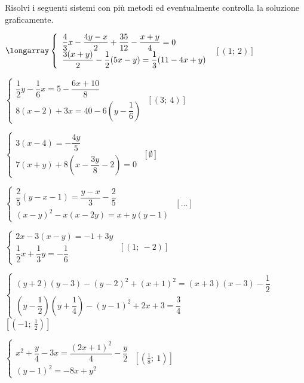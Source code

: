 \begin{esercizio}[\Ast]
 \label{ese:22.75}
 Risolvi i seguenti sistemi con più metodi ed eventualmente controlla
la soluzione graficamente.
\begin{enumeratea}
 {\longarray
 \item $\longarray\left\{\begin{array}{l}
 \dfrac{4}{3}x-\dfrac{4y-x}{2}+\dfrac{35}{12}-\dfrac{x+y}{4}=0\\
 \dfrac{3(x+y)}{2}-\dfrac{1}{2}(5x-y)=\dfrac{1}{3}(11-4x+y)\end{array}\right.$
 \hfill $\left[(1;~2)\right]$
\item $\left\{\begin{array}{l}
\dfrac{1}{2}y-\dfrac{1}{6}x=5-\dfrac{6x+10}{8}\\
8(x-2)+3x=40-6\left(y-\dfrac{1}{6}\right)\end{array}\right.$
 \hfill $\left[(3;~4)\right]$
\item $\left\{\begin{array}{l}
3(x-4)=-{\dfrac{4y}{5}}\\
7(x+y)+8\left(x-\dfrac{3y}{8}
-2\right)=0\end{array}\right.$
 \hfill $\left[\emptyset\right]$
\item $\left\{\begin{array}{l}
\dfrac{2}{5}(y-x-1)=\dfrac{y-x}{3}-\dfrac{2}{5}\\
(x-y)^{2}-x(x-2y)=x+y(y-1)\end{array}\right.$
 \hfill $\left[...\right]$
\item $\left\{\begin{array}{l}
2x-3(x-y)=-1+3y\\
\dfrac{1}{2}x+\dfrac{1}{3}y=-{\dfrac{1}{6}}\end{array}\right.$
 \hfill $\left[(1;~-2)\right]$
\item $\left\{\begin{array}{l}
(y+2)(y-3)-(y-2)^{2}+(x+1)^{2}=(x+3)(x-3)-\dfrac{1}{2}\\
\left(y-\dfrac{1}{2}\right)\left(y+\dfrac{1}{4}\right)-(y-1)^{2}+2x+3=
    \dfrac{3}{4}\end{array}\right.$
 \hfill $\left[(-1;~\frac{1}{2})\right]$
\item $\left\{\begin{array}{l}
x^{2}+\dfrac{y}{4}-3x=\dfrac{(2x+1)^{2}}{4}-\dfrac{y}{2}\\
(y-1)^{2}=-8x+y^{2}\end{array}\right.$
 \hfill $\left[(\frac{1}{8};~1)\right]$
}
\end{enumeratea}
\end{esercizio}
